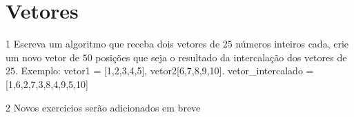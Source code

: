 \section{Vetores}
\begin{exercicio}
  {1}
  {Escreva um algoritmo que receba dois vetores de $25$ números inteiros cada, crie um novo vetor de $50$ posições que seja o resultado da intercalação dos vetores de $25$.}
  Exemplo: vetor1 = [1,2,3,4,5], vetor2[6,7,8,9,10]. vetor\_intercalado = [1,6,2,7,3,8,4,9,5,10]
\end{exercicio}

\begin{exercicio}
  {2}
  {Novos exercicios serão adicionados em breve}
\end{exercicio}